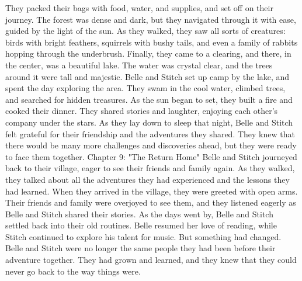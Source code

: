 \documentclass{book}%
\begin{document}
\newline%
They packed their bags with food, water, and supplies, and set off on their journey. The forest was dense and dark, but they navigated through it with ease, guided by the light of the sun.\newline%
\newline%
As they walked, they saw all sorts of creatures: birds with bright feathers, squirrels with bushy tails, and even a family of rabbits hopping through the underbrush.\newline%
\newline%
Finally, they came to a clearing, and there, in the center, was a beautiful lake. The water was crystal clear, and the trees around it were tall and majestic.\newline%
\newline%
Belle and Stitch set up camp by the lake, and spent the day exploring the area. They swam in the cool water, climbed trees, and searched for hidden treasures.\newline%
\newline%
As the sun began to set, they built a fire and cooked their dinner. They shared stories and laughter, enjoying each other's company under the stars.\newline%
\newline%
As they lay down to sleep that night, Belle and Stitch felt grateful for their friendship and the adventures they shared. They knew that there would be many more challenges and discoveries ahead, but they were ready to face them together.%
Chapter 9: "The Return Home"\newline%
Belle and Stitch journeyed back to their village, eager to see their friends and family again. As they walked, they talked about all the adventures they had experienced and the lessons they had learned.\newline%
\newline%
When they arrived in the village, they were greeted with open arms. Their friends and family were overjoyed to see them, and they listened eagerly as Belle and Stitch shared their stories.\newline%
\newline%
As the days went by, Belle and Stitch settled back into their old routines. Belle resumed her love of reading, while Stitch continued to explore his talent for music.\newline%
\newline%
But something had changed. Belle and Stitch were no longer the same people they had been before their adventure together. They had grown and learned, and they knew that they could never go back to the way things were.\newline%
\end{document}
